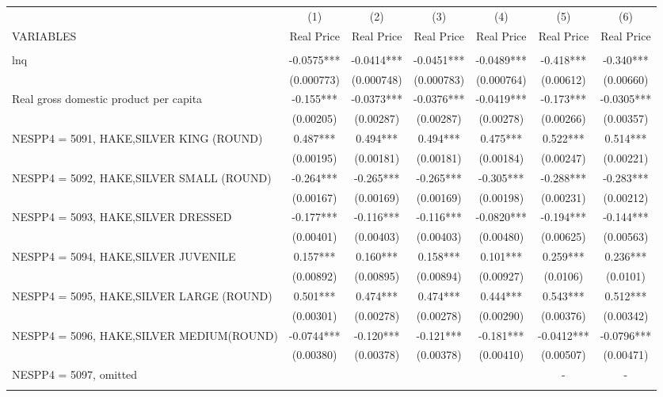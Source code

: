 \begin{tabular}{lcccccc} \hline
 & (1) & (2) & (3) & (4) & (5) & (6) \\
VARIABLES & Real Price & Real Price & Real Price & Real Price & Real Price & Real Price \\ \hline
 &  &  &  &  &  &  \\
lnq & -0.0575*** & -0.0414*** & -0.0451*** & -0.0489*** & -0.418*** & -0.340*** \\
 & (0.000773) & (0.000748) & (0.000783) & (0.000764) & (0.00612) & (0.00660) \\
Real gross domestic product per capita & -0.155*** & -0.0373*** & -0.0376*** & -0.0419*** & -0.173*** & -0.0305*** \\
 & (0.00205) & (0.00287) & (0.00287) & (0.00278) & (0.00266) & (0.00357) \\
NESPP4 = 5091, HAKE,SILVER KING (ROUND) & 0.487*** & 0.494*** & 0.494*** & 0.475*** & 0.522*** & 0.514*** \\
 & (0.00195) & (0.00181) & (0.00181) & (0.00184) & (0.00247) & (0.00221) \\
NESPP4 = 5092, HAKE,SILVER SMALL (ROUND) & -0.264*** & -0.265*** & -0.265*** & -0.305*** & -0.288*** & -0.283*** \\
 & (0.00167) & (0.00169) & (0.00169) & (0.00198) & (0.00231) & (0.00212) \\
NESPP4 = 5093, HAKE,SILVER DRESSED & -0.177*** & -0.116*** & -0.116*** & -0.0820*** & -0.194*** & -0.144*** \\
 & (0.00401) & (0.00403) & (0.00403) & (0.00480) & (0.00625) & (0.00563) \\
NESPP4 = 5094, HAKE,SILVER JUVENILE & 0.157*** & 0.160*** & 0.158*** & 0.101*** & 0.259*** & 0.236*** \\
 & (0.00892) & (0.00895) & (0.00894) & (0.00927) & (0.0106) & (0.0101) \\
NESPP4 = 5095, HAKE,SILVER LARGE (ROUND) & 0.501*** & 0.474*** & 0.474*** & 0.444*** & 0.543*** & 0.512*** \\
 & (0.00301) & (0.00278) & (0.00278) & (0.00290) & (0.00376) & (0.00342) \\
NESPP4 = 5096, HAKE,SILVER MEDIUM(ROUND) & -0.0744*** & -0.120*** & -0.121*** & -0.181*** & -0.0412*** & -0.0796*** \\
 & (0.00380) & (0.00378) & (0.00378) & (0.00410) & (0.00507) & (0.00471) \\
NESPP4 = 5097, omitted &  &  &  &  & - & - \\
 &  &  &  &  &  &  \\

\end{tabular}
